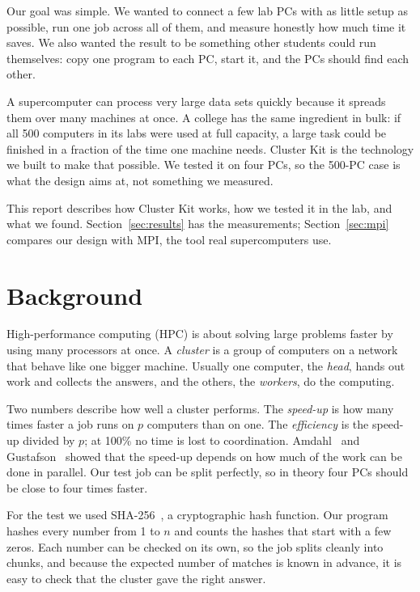 \documentclass[11pt,a4paper]{article}
\let\oldsection\section
\renewcommand{\section}{\Needspace{6\baselineskip}\oldsection}
\begin{document}
Our goal was simple. We wanted to connect a few lab PCs with as little setup as possible, run one job across all of them, and measure honestly how much time it saves. We also wanted the result to be something other students could run themselves: copy one program to each PC, start it, and the PCs should find each other.

A supercomputer can process very large data sets quickly because it spreads them over many machines at once. A college has the same ingredient in bulk: if all 500 computers in its labs were used at full capacity, a large task could be finished in a fraction of the time one machine needs. Cluster Kit is the technology we built to make that possible. We tested it on four PCs, so the 500-PC case is what the design aims at, not something we measured.\par\smallskip\noindent This report describes how Cluster Kit works, how we tested it in the lab, and what we found. Section~\ref{sec:results} has the measurements; Section~\ref{sec:mpi} compares our design with MPI, the tool real supercomputers use.

\section{Background}
High-performance computing (HPC) is about solving large problems faster by using many processors at once. A \emph{cluster} is a group of computers on a network that behave like one bigger machine. Usually one computer, the \emph{head}, hands out work and collects the answers, and the others, the \emph{workers}, do the computing.

Two numbers describe how well a cluster performs. The \emph{speed-up} is how many times faster a job runs on $p$ computers than on one. The \emph{efficiency} is the speed-up divided by $p$; at 100\% no time is lost to coordination. Amdahl~\cite{amdahl} and Gustafson~\cite{gustafson} showed that the speed-up depends on how much of the work can be done in parallel. Our test job can be split perfectly, so in theory four PCs should be close to four times faster.

For the test we used SHA-256~\cite{fips}, a cryptographic hash function. Our program hashes every number from 1 to $n$ and counts the hashes that start with a few zeros. Each number can be checked on its own, so the job splits cleanly into chunks, and because the expected number of matches is known in advance, it is easy to check that the cluster gave the right answer.
\end{document}

